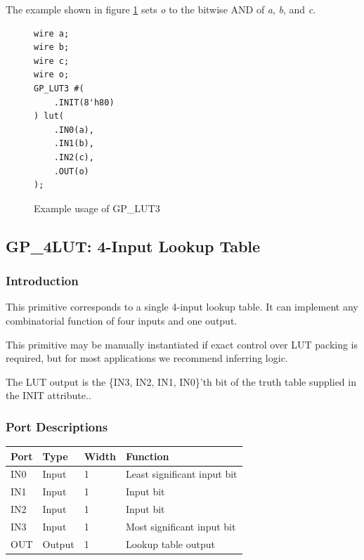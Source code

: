 \documentclass{article}
\begin{document}
The example shown in figure \ref{gp-lut3-example} sets \emph{o} to the bitwise AND of \emph{a}, \emph{b}, and \emph{c}.

\begin{figure}[h]
\begin{lstlisting}
wire a;
wire b;
wire c;
wire o;
GP_LUT3 #(
	.INIT(8'h80)
) lut(
	.IN0(a),
	.IN1(b),
	.IN2(c),
	.OUT(o)
);
\end{lstlisting}
\caption{Example usage of GP\_LUT3}
\label{gp-lut3-example}
\end{figure}


\pagebreak
\subsection{GP\_4LUT: 4-Input Lookup Table}

\subsubsection{Introduction}
This primitive corresponds to a single 4-input lookup table. It can implement any combinatorial function of four 
inputs and one output.

This primitive may be manually instantiated if exact control over LUT packing is required, but for most applications we 
recommend inferring logic.

The LUT output is the \{IN3, IN2, IN1, IN0\}'th bit of the truth table supplied in the INIT attribute..

\subsubsection{Port Descriptions}

\begin{tabularx}{4in}{|l|l|l|X|}
\hline
{\bfseries Port} & {\bfseries Type} & {\bfseries Width} & {\bfseries Function} \\
\hline
IN0 & Input & 1 & Least significant input bit \\
\hline
IN1 & Input & 1 & Input bit \\
\hline
IN2 & Input & 1 & Input bit \\
\hline
IN3 & Input & 1 & Most significant input bit \\
\hline
OUT & Output & 1 & Lookup table output \\
\hline
\end{tabularx}
\end{document}
